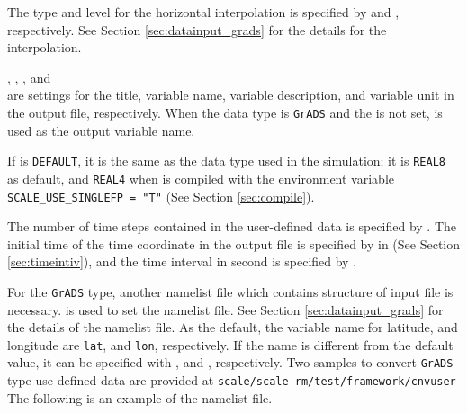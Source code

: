The type and level for the horizontal interpolation is specified by  and , respectively.
See Section \ref{sec:datainput_grads} for the details for the interpolation.

, , , and \\
 are settings for the title, variable name, variable description, and variable unit in the output file, respectively.
When the data type is \verb|GrADS| and the  is not set,  is used as the output variable name.

If  is \verb|DEFAULT|, it is the same as the data type used in the simulation;
it is \verb|REAL8| as default, and \verb|REAL4| when \scalerm is compiled with the environment variable \verb|SCALE_USE_SINGLEFP = "T"| (See Section \ref{sec:compile}).

The number of time steps contained in the user-defined data is specified by .
The initial time of the time coordinate in the output file is specified by  in  (See Section \ref{sec:timeintiv}), and the time interval in second is specified by .



For the \verb|GrADS| type, another namelist file which contains structure of input file is necessary.
 is used to set the namelist file.
See Section \ref{sec:datainput_grads} for the details of the namelist file.
As the default, the variable name for latitude, and longitude are \verb|lat|, and \verb|lon|, respectively.
If the name is different from the default value, it can be specified with , and , respectively.
Two samples to convert \verb|GrADS|-type use-defined data are provided at \verb|scale/scale-rm/test/framework/cnvuser|
The following is an example of the namelist file.



